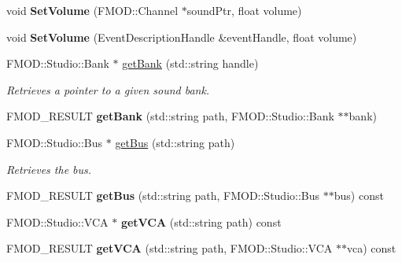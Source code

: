 \begin{DoxyCompactItemize}
\item 
\hypertarget{classDCEngine_1_1Systems_1_1AudioFMOD_aafd2f1a9ff50ba390c324ae4eac7bc04}{void {\bfseries Set\-Volume} (F\-M\-O\-D\-::\-Channel $\ast$sound\-Ptr, float volume)}\label{classDCEngine_1_1Systems_1_1AudioFMOD_aafd2f1a9ff50ba390c324ae4eac7bc04}

\item 
\hypertarget{classDCEngine_1_1Systems_1_1AudioFMOD_a166a673b4118f283b09d93006716b226}{void {\bfseries Set\-Volume} (Event\-Description\-Handle \&event\-Handle, float volume)}\label{classDCEngine_1_1Systems_1_1AudioFMOD_a166a673b4118f283b09d93006716b226}

\item 
F\-M\-O\-D\-::\-Studio\-::\-Bank $\ast$ \hyperlink{classDCEngine_1_1Systems_1_1AudioFMOD_a571388ad63c66873859ca886260b3391}{get\-Bank} (std\-::string handle)
\begin{DoxyCompactList}\small\item\em Retrieves a pointer to a given sound bank. \end{DoxyCompactList}\item 
\hypertarget{classDCEngine_1_1Systems_1_1AudioFMOD_a8723ee1355d7015ad233574de0732dd2}{F\-M\-O\-D\-\_\-\-R\-E\-S\-U\-L\-T {\bfseries get\-Bank} (std\-::string path, F\-M\-O\-D\-::\-Studio\-::\-Bank $\ast$$\ast$bank)}\label{classDCEngine_1_1Systems_1_1AudioFMOD_a8723ee1355d7015ad233574de0732dd2}

\item 
F\-M\-O\-D\-::\-Studio\-::\-Bus $\ast$ \hyperlink{classDCEngine_1_1Systems_1_1AudioFMOD_a6a258f8de2af79c25ce96642a03e6851}{get\-Bus} (std\-::string path)
\begin{DoxyCompactList}\small\item\em Retrieves the bus. \end{DoxyCompactList}\item 
\hypertarget{classDCEngine_1_1Systems_1_1AudioFMOD_acbea7bbdf138165c62d1419397f08827}{F\-M\-O\-D\-\_\-\-R\-E\-S\-U\-L\-T {\bfseries get\-Bus} (std\-::string path, F\-M\-O\-D\-::\-Studio\-::\-Bus $\ast$$\ast$bus) const }\label{classDCEngine_1_1Systems_1_1AudioFMOD_acbea7bbdf138165c62d1419397f08827}

\item 
\hypertarget{classDCEngine_1_1Systems_1_1AudioFMOD_a7a944a1adb6fec6891dbc544a565de78}{F\-M\-O\-D\-::\-Studio\-::\-V\-C\-A $\ast$ {\bfseries get\-V\-C\-A} (std\-::string path) const }\label{classDCEngine_1_1Systems_1_1AudioFMOD_a7a944a1adb6fec6891dbc544a565de78}

\item 
\hypertarget{classDCEngine_1_1Systems_1_1AudioFMOD_a68e5d11a5762f20017d45c583f42f9ad}{F\-M\-O\-D\-\_\-\-R\-E\-S\-U\-L\-T {\bfseries get\-V\-C\-A} (std\-::string path, F\-M\-O\-D\-::\-Studio\-::\-V\-C\-A $\ast$$\ast$vca) const }\label{classDCEngine_1_1Systems_1_1AudioFMOD_a68e5d11a5762f20017d45c583f42f9ad}

\end{DoxyCompactItemize}
